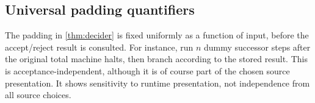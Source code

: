 \subsection{Universal padding quantifiers}

The padding in
\cref{thm:decider} is fixed uniformly as a function of input, before the
accept/reject result is consulted.  For instance, run $n$ dummy successor
steps after the original total machine halts, then branch according to the
stored result.  This is acceptance-independent, although it is of course part
of the chosen source presentation.  It shows sensitivity to runtime
presentation, not independence from all source choices.
